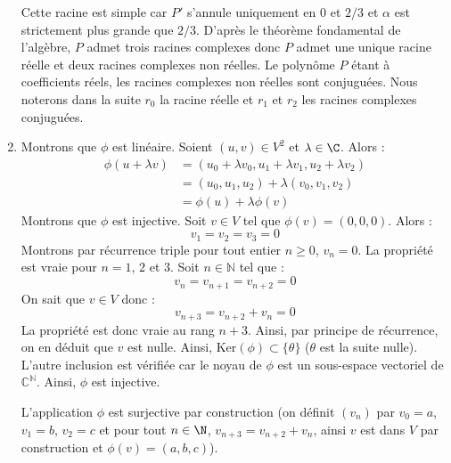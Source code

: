 \documentclass[a4paper,twoside,french,11pt]{VcCours}
\begin{document}
\begin{enumerate}
\noindent Cette racine est simple car $P'$ s'annule uniquement en $0$ et $2/3$ et $\alpha$ est strictement plus grande que $2/3$. D'après le théorème fondamental de l'algèbre, $P$ admet trois racines complexes donc $P$ admet une unique racine réelle et deux racines complexes non réelles. Le polynôme $P$ étant à coefficients réels, les racines complexes non réelles sont conjuguées. Nous noterons dans la suite $r_0$ la racine réelle et $r_1$ et $r_2$ les racines complexes conjuguées.
 \item Montrons que $\phi$ est linéaire. Soient $(u,v)\in V^2$ et $\lambda\in\C$. Alors :
 \begin{align*}
\phi(u+\lambda v) & =(u_0+\lambda v_0,u_1+\lambda v_1,u_2+\lambda v_2) \\
& =(u_0,u_1,u_2)+\lambda(v_0,v_1,v_2) \\
& =\phi(u)+\lambda\phi(v)
\end{align*}
Montrons que $\phi$ est injective. Soit $v \in V$ tel que $\phi(v)=(0,0,0)$. Alors :
$$ v_1=v_2=v_3=0$$
Montrons par récurrence triple pour tout entier $n \geq 0$, $v_n=0$. La propriété est vraie pour $n=1$, $2$ et $3$. Soit $n \in \mathbb{N}$ tel que :
$$ v_n=v_{n+1}=v_{n+2} = 0$$
On sait que $v \in V$ donc :
$$ v_{n+3}=v_{n+2}+v_n = 0 $$
La propriété est donc vraie au rang $n+3$. Ainsi, par principe de récurrence, on en déduit que $v$ est nulle. Ainsi, $\textrm{Ker}(\phi) \subset \lbrace \theta \rbrace$ ($\theta$ est la suite nulle). L'autre inclusion est vérifiée car le noyau de $\phi$ est un sous-espace vectoriel de $\mathbb{C}^{\mathbb{N}}$. Ainsi, $\phi$ est injective.




\noindent L'application $\phi$ est surjective par construction (on définit $(v_n)$ par $v_0=a$, $v_1=b$, $v_2=c$ et pour tout $n\in\N$, $v_{n+3}=v_{n+2}+v_n$, ainsi $v$ est dans $V$ par construction et $\phi(v)=(a,b,c)$). 





\end{enumerate}
\end{document}
